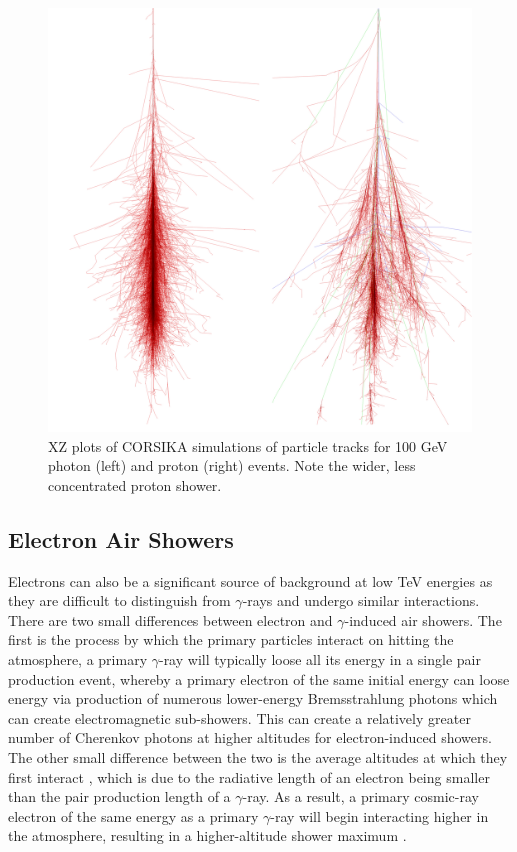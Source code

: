 \begin{figure}
\begin{center}  

\includegraphics[width=0.5\columnwidth,trim=4 4 30 4,clip]{figures/showers.png}
 
\caption{XZ plots of CORSIKA simulations of particle tracks for 100 GeV photon (left) and proton (right) events. Note the wider, less concentrated proton shower. \cite{corskplot}}
\label{fig:image2}
\end{center}
\end{figure}
\subsection{Electron Air Showers}

Electrons can also be a significant source of background at low TeV energies as they are difficult to distinguish from $\gamma$-rays and undergo similar interactions. There are two small differences between electron and $\gamma$-induced air showers. The first is the process by which the primary particles interact on hitting the atmosphere, a primary $\gamma$-ray will typically loose all its energy in a single pair production event, whereby a primary electron of the same initial energy can loose energy via production of numerous lower-energy Bremsstrahlung photons which can create electromagnetic sub-showers. This can create a relatively greater number of Cherenkov photons at higher altitudes for electron-induced showers. The other small difference between the two is the average altitudes at which they first interact \cite{Sitarek1i}, which is due to the radiative length of an electron being smaller than the pair production length of a $\gamma$-ray. As a result, a primary cosmic-ray electron of the same energy as a primary $\gamma$-ray will begin interacting higher in the atmosphere, resulting in a higher-altitude shower maximum \cite{lypova}. 

